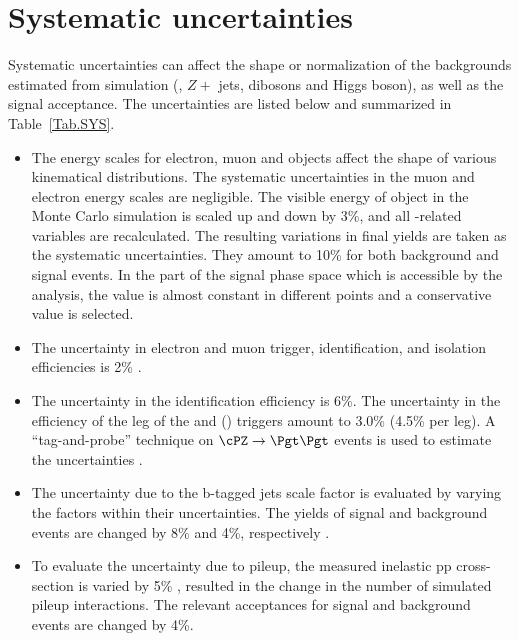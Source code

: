 \section{Systematic uncertainties}
\label{sect:sys}
Systematic uncertainties can affect the shape or normalization of the
backgrounds estimated from simulation (\ttbar, $Z+$ jets, dibosons and Higgs boson), 
as well as the signal acceptance. 
The uncertainties are listed below and summarized in Table~\ref{Tab.SYS}.


\begin{itemize}

\item  The energy scales for electron, muon and \Tau objects affect the shape of various kinematical distributions.
 The systematic uncertainties in the muon and electron energy scales are negligible.
The visible energy of \Tau object in the Monte Carlo simulation is scaled up and down
by 3\%, and all \Tau-related variables are recalculated. The resulting variations in
final yields are taken as the systematic uncertainties. They amount to 10\% for both
background and signal events. In the part of the signal phase space which is accessible by
the analysis, the value is almost constant in different points and a conservative value
is selected.


\item The uncertainty in electron and muon trigger, identification, and
  isolation efficiencies is 2\% \cite{Khachatryan:2014wca}.

\item The uncertainty in the \Tau identification efficiency is 6\%. 
  The uncertainty in the efficiency of the \Tau leg of the \eTau and
  \muTau (\tauTau) triggers amount to 3.0\% (4.5\% per leg).
  A ``tag-and-probe'' technique on $\cPZ\to \Pgt\Pgt$ events is used to estimate the 
  uncertainties \cite{Khachatryan:2014wca}.

\item The uncertainty due to the b-tagged jets scale factor is evaluated by varying the 
factors within their uncertainties. The yields of signal and background events are changed by 8\% 
and 4\%, respectively \cite{Chatrchyan:2012jua}.
 
\item To evaluate the uncertainty due to pileup, the measured inelastic pp cross-section is
  varied by 5\% \cite{Antchev:2011vs}, resulted in the change in the number of simulated pileup interactions.
 The relevant acceptances for signal and background events are changed by 4\%.


\end{itemize}
